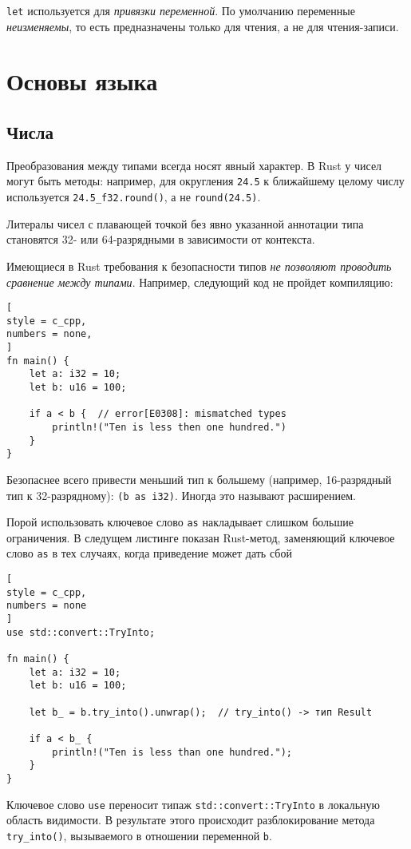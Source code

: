\documentclass[%
	11pt,
	a4paper,
	utf8,
		]{article}
\begin{document}
\texttt{let} используется для \emph{привязки переменной}. По умолчанию переменные \emph{неизменяемы}, то есть предназначены только для чтения, а не для чтения-записи.

\section{Основы языка}

\subsection{Числа}

Преобразования между типами всегда носят явный характер. В Rust у чисел могут быть методы: например, для округления \texttt{24.5} к ближайшему целому числу используется \verb|24.5_f32.round()|, а не \verb|round(24.5)|.

Литералы чисел с плавающей точкой без явно указанной аннотации типа становятся 32- или 64-разрядными в зависимости от контекста.

Имеющиеся в Rust требования к безопасности типов \emph{не позволяют проводить сравнение между типами}. Например, следующий код не пройдет компиляцию:
\begin{lstlisting}[
style = c_cpp,
numbers = none,
]
fn main() {
    let a: i32 = 10;
    let b: u16 = 100;
    
    if a < b {  // error[E0308]: mismatched types
        println!("Ten is less then one hundred.")
    }
}
\end{lstlisting} 

Безопаснее всего привести меньший тип к большему (например, 16-разрядный тип к 32-разрядному): \verb|(b as i32)|. Иногда это называют расширением.

Порой использовать ключевое слово \texttt{as} накладывает слишком большие ограничения. В следущем листинге показан Rust-метод, заменяющий ключевое слово \texttt{as} в тех случаях, когда приведение может дать сбой
\begin{lstlisting}[
style = c_cpp,
numbers = none
]
use std::convert::TryInto;

fn main() {
    let a: i32 = 10;
    let b: u16 = 100;
    
    let b_ = b.try_into().unwrap();  // try_into() -> тип Result
    
    if a < b_ {
        println!("Ten is less than one hundred.");
    }
}
\end{lstlisting}

Ключевое слово \texttt{use} переносит типаж \verb|std::convert::TryInto| в локальную область видимости. В результате этого происходит разблокирование метода \verb|try_into()|, вызываемого в отношении переменной \texttt{b}. 
\end{document}
